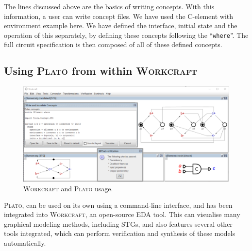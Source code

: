 \documentclass[british, 10pt, conference, compsocconf]{IEEEtran}
\newcommand{\noun}[1]{\textsc{#1}}
\begin{document}

The lines discussed above are the basics of writing concepts. With this 
information, a user can write concept files. We have used the 
C-element with environment example here. We have defined the interface, initial 
state and the operation of this separately, by defining these concepts following the 
``\texttt{where}''. The full circuit specification is then 
composed of all of these defined concepts. 

\vspace{-2mm}

\subsection{Using \noun{Plato} from within \noun{Workcraft} \label{sec:workcraft_usage}}


\begin{figure}[t]
\begin{centering}
\includegraphics[scale=0.55]{Images/workcraft_design_flow.png}
\par\end{centering}
\begin{centering}
\protect\caption{\label{fig:design_flow_screenshot}\noun{Workcraft} and 
			\noun{Plato} usage.}
\par\end{centering}
\vspace{-5mm}
\end{figure}

\noun{Plato}, can be used on its own using a command-line interface, and has been
integrated into \noun{Workcraft}, an open-source EDA tool. This can visualise many graphical modeling
methods, including STGs, and also features several other tools integrated, which can perform verification
and synthesis of these models automatically.
\end{document}
